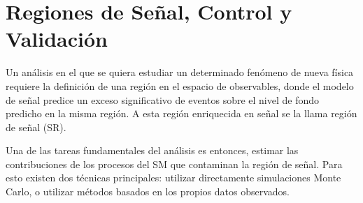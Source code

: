 \section{Regiones de Señal, Control y Validación}
\label{sec:regiones}

Un análisis en el que se quiera estudiar un determinado fenómeno de nueva física
requiere la definición de una región en el espacio de observables, donde el modelo de señal
predice un exceso significativo de eventos sobre el nivel de fondo predicho en
la misma región. A esta región enriquecida en señal se la llama región de señal
(SR).

Una de las tareas fundamentales del análisis es entonces, estimar las
contribuciones de los procesos del SM que contaminan la región de
señal.
Para esto existen dos técnicas principales: utilizar directamente simulaciones Monte Carlo,
o utilizar métodos basados en los propios datos observados.




